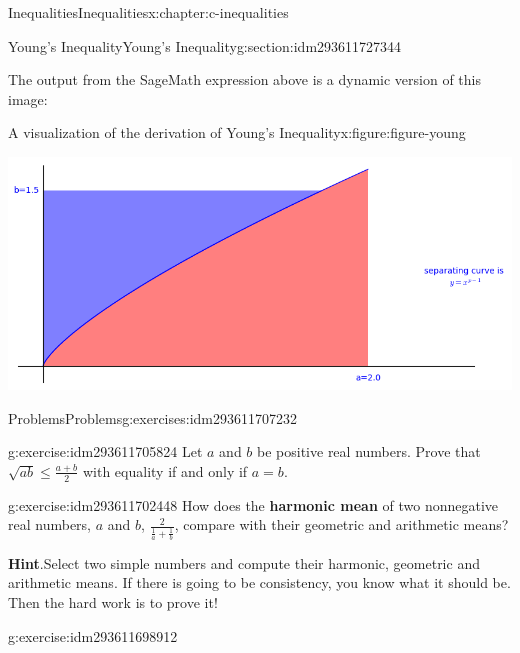 \documentclass[twoside,10pt,]{book}
\newcommand{\blocktitlefont}{\relax}
\newcommand{\terminology}[1]{\textbf{#1}}
\numberwithin{equation}{section}
\begin{document}
\begin{chapterptx}{Inequalities}{}{Inequalities}{}{}{x:chapter:c-inequalities}
\begin{sectionptx}{Young's Inequality}{}{Young's Inequality}{}{}{g:section:idm293611727344}
\begin{sageoutput}
\end{sageoutput}
The output from the SageMath expression above is a dynamic version of this image:%
\begin{figureptx}{A visualization of the derivation of Young's Inequality}{x:figure:figure-young}{}%
\begin{image}{0}{1}{0}%
\includegraphics[width=\linewidth]{images/young.png}
\end{image}%
\tcblower
\end{figureptx}%
\end{sectionptx}
%
%
\typeout{************************************************}
\typeout{************************************************}
%
\begin{exercises-section}{Problems}{}{Problems}{}{}{g:exercises:idm293611707232}
\begin{divisionexercise}{1}{}{}{g:exercise:idm293611705824}%
Let \(a\) and \(b\) be positive real numbers. Prove that \(\sqrt{a b}\leq \frac{a+b}{2}\)  with equality if and only if \(a=b\).%
\end{divisionexercise}%
\begin{divisionexercise}{2}{}{}{g:exercise:idm293611702448}%
%
How does the \terminology{harmonic mean} of two nonnegative real numbers, \(a\) and \(b\),  \(\frac{2}{\frac{1}{a}+\frac{1}{b}}\), compare with their geometric and arithmetic means?%
\par\smallskip%
\noindent\textbf{\blocktitlefont Hint}.\label{g:hint:idm293611699488}{}\hypertarget{g:hint:idm293611699488}{}\quad{}Select two simple numbers and compute their harmonic, geometric and arithmetic means.  If there is going to be consistency, you know what it should be.  Then the hard work is to prove it!%
\end{divisionexercise}%
\begin{divisionexercise}{3}{}{}{g:exercise:idm293611698912}%
%

\end{divisionexercise}
\end{exercises-section}
\end{chapterptx}
\end{document}
